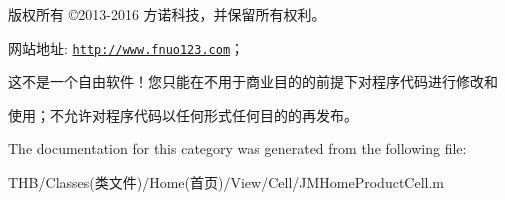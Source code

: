 版权所有 ©2013-\/2016 方诺科技，并保留所有权利。

网站地址\+: \href{http://www.fnuo123.com}{\tt http\+://www.\+fnuo123.\+com}； 



这不是一个自由软件！您只能在不用于商业目的的前提下对程序代码进行修改和

使用；不允许对程序代码以任何形式任何目的的再发布。 

 

The documentation for this category was generated from the following file\+:\begin{DoxyCompactItemize}
\item 
T\+H\+B/\+Classes(类文件)/\+Home(首页)/\+View/\+Cell/J\+M\+Home\+Product\+Cell.\+m\end{DoxyCompactItemize}
